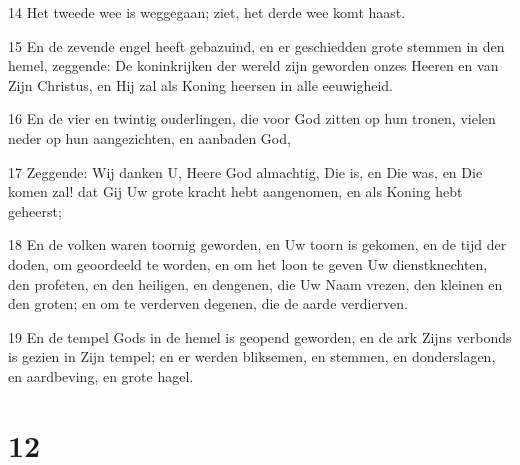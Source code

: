\par 14 Het tweede wee is weggegaan; ziet, het derde wee komt haast.
\par 15 En de zevende engel heeft gebazuind, en er geschiedden grote stemmen in den hemel, zeggende: De koninkrijken der wereld zijn geworden onzes Heeren en van Zijn Christus, en Hij zal als Koning heersen in alle eeuwigheid.
\par 16 En de vier en twintig ouderlingen, die voor God zitten op hun tronen, vielen neder op hun aangezichten, en aanbaden God,
\par 17 Zeggende: Wij danken U, Heere God almachtig, Die is, en Die was, en Die komen zal! dat Gij Uw grote kracht hebt aangenomen, en als Koning hebt geheerst;
\par 18 En de volken waren toornig geworden, en Uw toorn is gekomen, en de tijd der doden, om geoordeeld te worden, en om het loon te geven Uw dienstknechten, den profeten, en den heiligen, en dengenen, die Uw Naam vrezen, den kleinen en den groten; en om te verderven degenen, die de aarde verdierven.
\par 19 En de tempel Gods in de hemel is geopend geworden, en de ark Zijns verbonds is gezien in Zijn tempel; en er werden bliksemen, en stemmen, en donderslagen, en aardbeving, en grote hagel.

\chapter{12}

